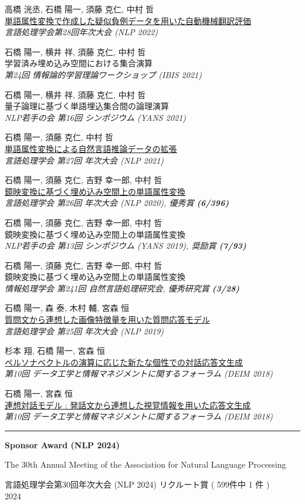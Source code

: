 \documentclass[11pt,letterpaper]{article}
\let\oldhref\href
\renewcommand{\href}[2]{\oldhref{#1}{\uline{#2}}}
\newlength{\labelcol}\setlength{\labelcol}{1.2in}
\newlength{\labelgap}\setlength{\labelgap}{0.21in}
\newcommand{\cvsection}[1]{%
  \par\vspace{26pt}%
  {\noindent\rule{\textwidth}{2.4pt}\par}\nopagebreak\vspace{9pt}%
  \noindent\llap{\smash[b]{\parbox[t]{\labelcol}{\raggedright\large\bfseries #1}}\hspace{\labelgap}}\ignorespaces}
\newcommand{\entryfirst}[1]{\textbf{#1}\par\nopagebreak}
\newcommand{\awardline}[1]{{\par\raggedleft #1\par}}
\newcommand{\paper}[3]{\par\vspace{12pt}\noindent #1\\ #2\\ {\itshape #3}\par}
\begin{document}
\paper{高橋 洸丞, 石橋 陽一, 須藤 克仁, 中村 哲}
{\href{https://www.anlp.jp/proceedings/annual_meeting/2022/pdf_dir/G3-2.pdf}{単語属性変換で作成した疑似負例データを用いた自動機械翻訳評価}}
{\upshape 言語処理学会第28回年次大会 (NLP 2022)}

\paper{石橋 陽一, 横井 祥, 須藤 克仁, 中村 哲}
{学習済み埋め込み空間における集合演算}
{\upshape 第24回 情報論的学習理論ワークショップ (IBIS 2021)}

\paper{石橋 陽一, 横井 祥, 須藤 克仁, 中村 哲}
{量子論理に基づく単語埋込集合間の論理演算}
{\upshape NLP若手の会 第16回 シンポジウム (YANS 2021)}

\paper{石橋 陽一, 須藤 克仁, 中村 哲}
{\href{https://www.anlp.jp/proceedings/annual_meeting/2021/pdf_dir/P4-13.pdf}{単語属性変換による自然言語推論データの拡張}}
{\upshape 言語処理学会 第27回 年次大会 (NLP 2021)}

\paper{石橋 陽一, 須藤 克仁, 吉野 幸一郎, 中村 哲}
{\href{https://www.anlp.jp/proceedings/annual_meeting/2020/pdf_dir/P6-2.pdf}{鏡映変換に基づく埋め込み空間上の単語属性変換}}
{\upshape 言語処理学会 第26回 年次大会 (NLP 2020), 優秀賞 \textbf{(6/396)}}

\paper{石橋 陽一, 須藤 克仁, 吉野 幸一郎, 中村 哲}
{鏡映変換に基づく埋め込み空間上の単語属性変換}
{\upshape NLP若手の会 第13回 シンポジウム (YANS 2019), 奨励賞 \textbf{(7/93)}}

\paper{石橋 陽一, 須藤 克仁, 吉野 幸一郎, 中村 哲}
{鏡映変換に基づく埋め込み空間上の単語属性変換}
{\upshape 情報処理学会 第241回 自然言語処理研究会, 優秀研究賞 \textbf{(3/28)}}

\paper{石橋 陽一, 森 泰, 木村 輔, 宮森 恒}
{\href{https://www.anlp.jp/proceedings/annual_meeting/2019/pdf_dir/D3-4.pdf}{質問文から連想した画像特徴量を用いた質問応答モデル}}
{\upshape 言語処理学会 第25回 年次大会 (NLP 2019)}

\paper{杉本 翔, 石橋 陽一, 宮森 恒}
{\href{https://db-event.jpn.org/deim2018/data/papers/347.pdf}{ペルソナベクトルの演算に応じた新たな個性での対話応答文生成}}
{\upshape 第10回 データ工学と情報マネジメントに関するフォーラム (DEIM 2018)}

\paper{石橋 陽一, 宮森 恒}
{\href{https://db-event.jpn.org/deim2018/data/papers/159.pdf}{連想対話モデル : 発話文から連想した視覚情報を用いた応答文生成}}
{\upshape 第10回 データ工学と情報マネジメントに関するフォーラム (DEIM 2018)}

\cvsection{Awards and Funding}%
\entryfirst{Sponsor Award (NLP 2024)}
The 30th Annual Meeting of the Association for Natural Language Processing
\awardline{言語処理学会第30回年次大会 (NLP 2024) リクルート賞 ( 599件中 1 件 )\\ 2024}
\end{document}

